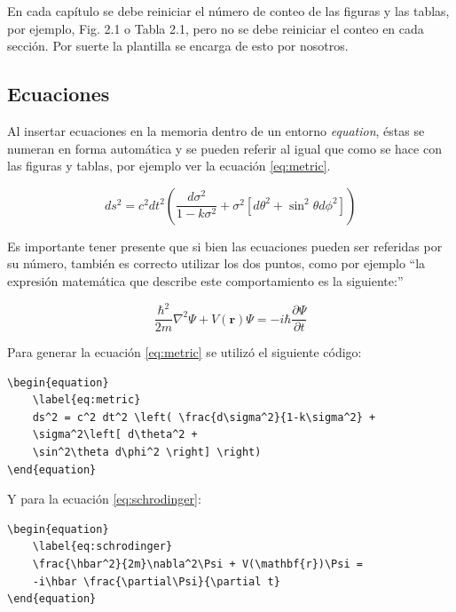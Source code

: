 En cada capítulo se debe reiniciar el número de conteo de las figuras y las tablas, por ejemplo, Fig. 2.1 o Tabla 2.1, pero no se debe reiniciar el conteo en cada sección. Por suerte la plantilla se encarga de esto por nosotros.

\subsection{Ecuaciones}
\label{sec:Ecuaciones}

Al insertar ecuaciones en la memoria dentro de un entorno \textit{equation}, éstas se numeran en forma automática  y se pueden referir al igual que como se hace con las figuras y tablas, por ejemplo ver la ecuación \ref{eq:metric}.

\begin{equation}
	\label{eq:metric}
	ds^2 = c^2 dt^2 \left( \frac{d\sigma^2}{1-k\sigma^2} + \sigma^2\left[ d\theta^2 + \sin^2\theta d\phi^2 \right] \right)
\end{equation}
                                                        
Es importante tener presente que si bien las ecuaciones pueden ser referidas por su número, también es correcto utilizar los dos puntos, como por ejemplo ``la expresión matemática que describe este comportamiento es la siguiente:''

\begin{equation}
	\label{eq:schrodinger}
	\frac{\hbar^2}{2m}\nabla^2\Psi + V(\mathbf{r})\Psi = -i\hbar \frac{\partial\Psi}{\partial t}
\end{equation}

Para generar la ecuación \ref{eq:metric} se utilizó el siguiente código:

\begin{verbatim}
\begin{equation}
	\label{eq:metric}
	ds^2 = c^2 dt^2 \left( \frac{d\sigma^2}{1-k\sigma^2} + 
	\sigma^2\left[ d\theta^2 + 
	\sin^2\theta d\phi^2 \right] \right)
\end{equation}
\end{verbatim}

Y para la ecuación \ref{eq:schrodinger}:

\begin{verbatim}
\begin{equation}
	\label{eq:schrodinger}
	\frac{\hbar^2}{2m}\nabla^2\Psi + V(\mathbf{r})\Psi = 
	-i\hbar \frac{\partial\Psi}{\partial t}
\end{equation}

\end{verbatim}